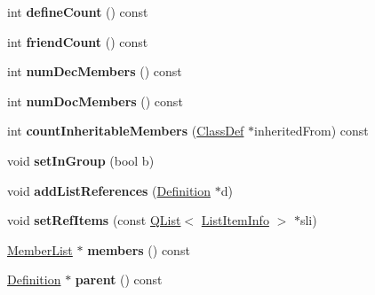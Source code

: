 \begin{DoxyCompactItemize}
\item 
\hypertarget{class_member_group_afeab0f0806bf85ae112d70d3f59d0ced}{int {\bfseries define\-Count} () const }\label{class_member_group_afeab0f0806bf85ae112d70d3f59d0ced}

\item 
\hypertarget{class_member_group_a8f80ae93edcb369f2676530f693f4938}{int {\bfseries friend\-Count} () const }\label{class_member_group_a8f80ae93edcb369f2676530f693f4938}

\item 
\hypertarget{class_member_group_a08247bad0051f28e6868e0f7da7864e5}{int {\bfseries num\-Dec\-Members} () const }\label{class_member_group_a08247bad0051f28e6868e0f7da7864e5}

\item 
\hypertarget{class_member_group_ab6e1e3c9200fa51d1751fed0c4ce7d7f}{int {\bfseries num\-Doc\-Members} () const }\label{class_member_group_ab6e1e3c9200fa51d1751fed0c4ce7d7f}

\item 
\hypertarget{class_member_group_af68ae71d4aa30721620cc315f8e68484}{int {\bfseries count\-Inheritable\-Members} (\hyperlink{class_class_def}{Class\-Def} $\ast$inherited\-From) const }\label{class_member_group_af68ae71d4aa30721620cc315f8e68484}

\item 
\hypertarget{class_member_group_a45d0951873af89710bd66de2b6f22f2d}{void {\bfseries set\-In\-Group} (bool b)}\label{class_member_group_a45d0951873af89710bd66de2b6f22f2d}

\item 
\hypertarget{class_member_group_a021d8c537b524952b3aef0e13d45f381}{void {\bfseries add\-List\-References} (\hyperlink{class_definition}{Definition} $\ast$d)}\label{class_member_group_a021d8c537b524952b3aef0e13d45f381}

\item 
\hypertarget{class_member_group_af54a06ad3eb9e93865968f0e10903184}{void {\bfseries set\-Ref\-Items} (const \hyperlink{class_q_list}{Q\-List}$<$ \hyperlink{struct_list_item_info}{List\-Item\-Info} $>$ $\ast$sli)}\label{class_member_group_af54a06ad3eb9e93865968f0e10903184}

\item 
\hypertarget{class_member_group_a6155474eb368f46d153b09aa2299edc4}{\hyperlink{class_member_list}{Member\-List} $\ast$ {\bfseries members} () const }\label{class_member_group_a6155474eb368f46d153b09aa2299edc4}

\item 
\hypertarget{class_member_group_afce352fa838f4e27c9b2878222903587}{\hyperlink{class_definition}{Definition} $\ast$ {\bfseries parent} () const }\label{class_member_group_afce352fa838f4e27c9b2878222903587}


\end{DoxyCompactItemize}
